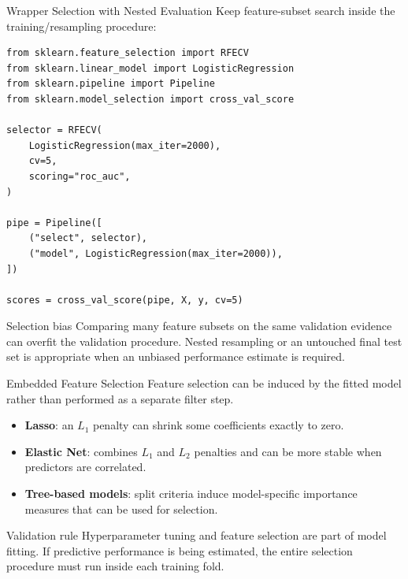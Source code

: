 \documentclass[aspectratio=169,11pt]{beamer}
\begin{document}
\begin{frame}[fragile]{Wrapper Selection with Nested Evaluation}
Keep feature-subset search inside the training/resampling procedure:

\begin{lstlisting}[style=code,basicstyle=\ttfamily\small]
from sklearn.feature_selection import RFECV
from sklearn.linear_model import LogisticRegression
from sklearn.pipeline import Pipeline
from sklearn.model_selection import cross_val_score

selector = RFECV(
    LogisticRegression(max_iter=2000),
    cv=5,
    scoring="roc_auc",
)

pipe = Pipeline([
    ("select", selector),
    ("model", LogisticRegression(max_iter=2000)),
])

scores = cross_val_score(pipe, X, y, cv=5)
\end{lstlisting}

\begin{block}{Selection bias}
Comparing many feature subsets on the same validation evidence can overfit the validation procedure. Nested resampling or an untouched final test set is appropriate when an unbiased performance estimate is required.
\end{block}
\end{frame}

\begin{frame}{Embedded Feature Selection}
Feature selection can be induced by the fitted model rather than performed as a separate filter step.

\begin{itemize}
  \item \textbf{Lasso}: an $L_1$ penalty can shrink some coefficients exactly to zero.
  \item \textbf{Elastic Net}: combines $L_1$ and $L_2$ penalties and can be more stable when predictors are correlated.
  \item \textbf{Tree-based models}: split criteria induce model-specific importance measures that can be used for selection.
\end{itemize}

\begin{alertblock}{Validation rule}
Hyperparameter tuning and feature selection are part of model fitting. If predictive performance is being estimated, the entire selection procedure must run inside each training fold.
\end{alertblock}
\end{frame}
\end{document}
